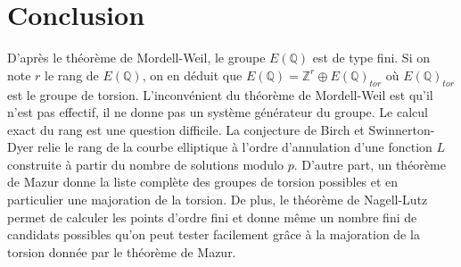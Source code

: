 \documentclass{article}
\begin{document}
\section{Conclusion}
D'après le théorème de Mordell-Weil, le groupe $E(\mathbb{Q})$ est de type fini. Si on note $r$ le rang de
$E(\mathbb{Q})$, on en déduit que $E(\mathbb{Q})=\mathbb{Z}^r \oplus E(\mathbb{Q})_{tor}$ où $E(\mathbb{Q})_{tor}$
est le groupe de torsion. L'inconvénient du théorème de Mordell-Weil est qu'il n'est pas effectif, il ne donne pas
un système générateur du groupe. Le calcul exact du rang est une question difficile. La conjecture
de Birch et Swinnerton-Dyer relie le rang de la courbe elliptique à l'ordre d'annulation d'une fonction $L$
construite à partir du nombre de solutions modulo $p$. D'autre part, un théorème de Mazur donne la
liste complète des groupes de torsion possibles et en particulier une majoration de la torsion.
De plus, le théorème de Nagell-Lutz permet de calculer les points d'ordre fini et donne même un nombre fini
de candidats possibles qu'on peut tester facilement grâce à la majoration de la torsion donnée par le théorème
de Mazur.



\end{document}

